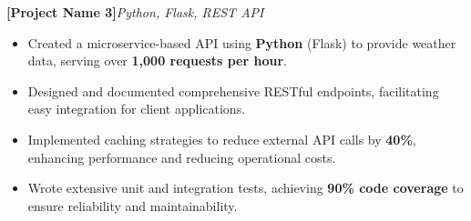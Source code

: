 \documentclass{article}
\newcommand{\ressubheading}[2]{%
  \vspace{4pt}\noindent\textbf{#1}\hfill\textit{#2}%
  \par\vspace{2pt}%
}
\begin{document}
\ressubheading{[Project Name 3]}{Python, Flask, REST API}
\begin{itemize}[nosep]
    \item Created a microservice-based API using \textbf{Python} (Flask) to provide weather data, serving over \textbf{1,000 requests per hour}.
    \item Designed and documented comprehensive RESTful endpoints, facilitating easy integration for client applications.
    \item Implemented caching strategies to reduce external API calls by \textbf{40\%}, enhancing performance and reducing operational costs.
    \item Wrote extensive unit and integration tests, achieving \textbf{90\% code coverage} to ensure reliability and maintainability.
\end{itemize}
\end{document}

